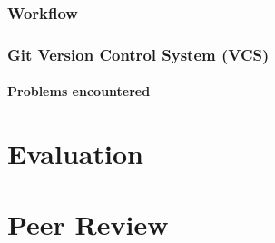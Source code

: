 \documentclass[11pt,a4paper]{report}
\begin{document}
\subsection{Workflow}



\subsection{Git Version Control System (VCS)}




\subsubsection{Problems encountered}



\chapter{Evaluation}



\chapter{Peer Review}


{
}
\end{document}
